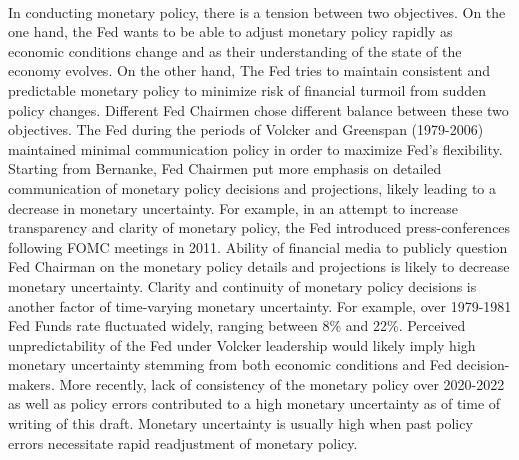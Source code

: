 \documentclass[12pt]{article}
\begin{document}
\paragraph{}
In conducting monetary policy, there is a tension between two objectives. On the one hand, the Fed wants to be able to adjust monetary policy rapidly as economic conditions change and as their understanding of the state of the economy evolves. On the other hand, The Fed tries to maintain consistent and predictable monetary policy to minimize risk of financial turmoil from sudden policy changes. Different Fed Chairmen chose different balance between these two objectives. The Fed during the periods of Volcker and Greenspan (1979-2006) maintained minimal communication policy in order to maximize Fed's flexibility. Starting from Bernanke, Fed Chairmen put more emphasis on detailed communication of monetary policy decisions and projections, likely leading to a decrease in monetary uncertainty. For example, in an attempt to increase transparency and clarity of monetary policy, the Fed introduced press-conferences following FOMC meetings in 2011. Ability of financial media to publicly question Fed Chairman on the monetary policy details and projections is likely to decrease monetary uncertainty. Clarity and continuity of monetary policy decisions is another factor of time-varying monetary uncertainty. For example, over 1979-1981 Fed Funds rate fluctuated widely, ranging between 8\% and 22\%. Perceived unpredictability of the Fed under Volcker leadership would likely imply high monetary uncertainty stemming from both economic conditions and Fed decision-makers. More recently, lack of consistency of the monetary policy over 2020-2022 as well as policy errors contributed to a high monetary uncertainty as of time of writing of this draft. Monetary uncertainty is usually high when past policy errors necessitate rapid readjustment of monetary policy.
\end{document}
